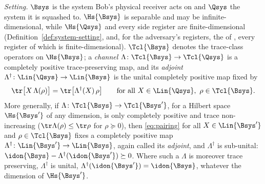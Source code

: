 \begin{lemma}\label{lem:sep}
\emph{Setting.} $\Bsys$ is the system Bob's physical receiver acts on and
$\Qsys$ the system it is squashed to. $\Hs{\Bsys}$ is separable and may be
infinite-dimensional, while $\Hs{\Qsys}$ and every side register are
finite-dimensional (Definition~\ref{def:system-setting}, and, for the
adversary's registers, the  of
, every register of which is
finite-dimensional). $\Tcl{\Bsys}$ denotes the
trace-class operators on $\Hs{\Bsys}$; a \emph{channel}
$\Lambda\colon\Tcl{\Bsys}\to\Tcl{\Qsys}$ is a completely positive
trace-preserving map, and its \emph{adjoint}
$\Lambda^{\dagger}\colon\Lin{\Qsys}\to\Lin{\Bsys}$ is the unital completely
positive map fixed by
\begin{equation}\label{eq:pairing}
  \tr\big[X\,\Lambda(\rho)\big]=\tr\big[\Lambda^{\dagger}(X)\,\rho\big]
  \qquad\text{for all }X\in\Lin{\Qsys},\ \rho\in\Tcl{\Bsys}.
\end{equation}
More generally, if $\Lambda\colon\Tcl{\Bsys}\to\Tcl{\Bsys'}$, for a Hilbert
space $\Hs{\Bsys'}$ of any dimension, is only completely positive and trace
non-increasing ($\tr\Lambda(\rho)\le\tr\rho$ for $\rho\succeq0$), then
\eqref{eq:pairing} for all $X\in\Lin{\Bsys'}$ and $\rho\in\Tcl{\Bsys}$ fixes
a completely positive map $\Lambda^{\dagger}\colon\Lin{\Bsys'}\to\Lin{\Bsys}$,
again called its \emph{adjoint}, and $\Lambda^{\dagger}$ is sub-unital:
$\idon{\Bsys}-\Lambda^{\dagger}(\idon{\Bsys'})\succeq0$. Where such a
$\Lambda$ is moreover trace preserving, $\Lambda^{\dagger}$ is unital,
$\Lambda^{\dagger}(\idon{\Bsys'})=\idon{\Bsys}$, whatever the dimension of
$\Hs{\Bsys'}$.


\end{lemma}
